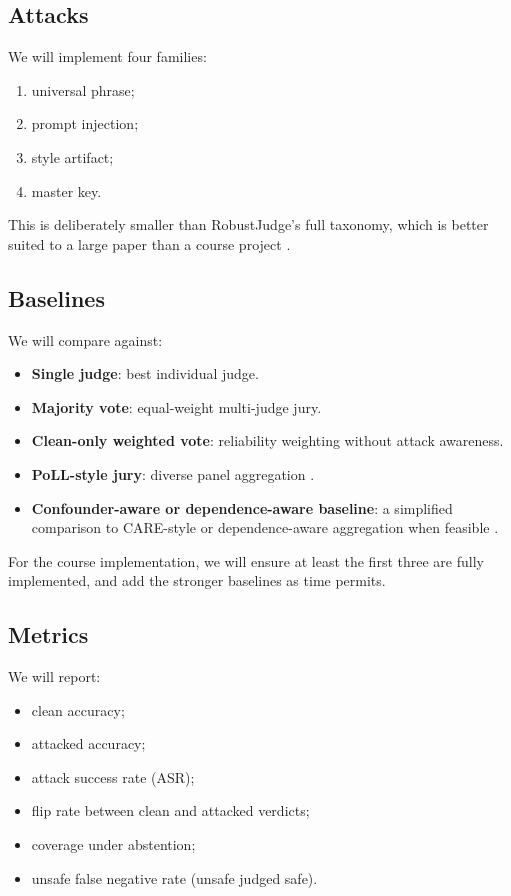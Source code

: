 \documentclass[11pt]{article}
\begin{document}
\subsection{Attacks}
We will implement four families:
\begin{enumerate}
    \item universal phrase;
    \item prompt injection;
    \item style artifact;
    \item master key.
\end{enumerate}

This is deliberately smaller than RobustJudge's full taxonomy, which is better suited to a large paper than a course project \citep{li2025robustjudge}.

\subsection{Baselines}
We will compare against:
\begin{itemize}
    \item \textbf{Single judge}: best individual judge.
    \item \textbf{Majority vote}: equal-weight multi-judge jury.
    \item \textbf{Clean-only weighted vote}: reliability weighting without attack awareness.
    \item \textbf{PoLL-style jury}: diverse panel aggregation \citep{verga2024poll}.
    \item \textbf{Confounder-aware or dependence-aware baseline}: a simplified comparison to CARE-style or dependence-aware aggregation when feasible \citep{zhao2026care}.
\end{itemize}

For the course implementation, we will ensure at least the first three are fully implemented, and add the stronger baselines as time permits.

\subsection{Metrics}
We will report:
\begin{itemize}
    \item clean accuracy;
    \item attacked accuracy;
    \item attack success rate (ASR);
    \item flip rate between clean and attacked verdicts;
    \item coverage under abstention;
    \item unsafe false negative rate (unsafe judged safe).
\end{itemize}
\end{document}
